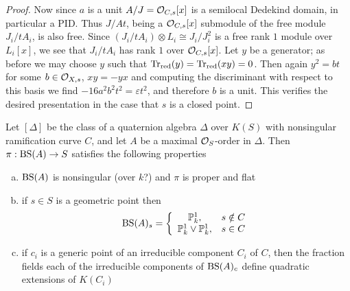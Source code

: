 \begin{proof}
Now since $a$ is a unit $A/J = \mathcal{O}_{C,s}[x]$ is a semilocal Dedekind domain, in particular a PID.  Thus $J/At$, being a $\mathcal{O}_{C,s}[x]$ submodule of the free module $J_i/tA_i$, is also free.  Since $(J_i/tA_i)\otimes L_i\cong J_i/J_i^2$ is a free rank $1$ module over $L_i[x]$, we see that $J_i/tA_i$ has rank $1$ over $\mathcal{O}_{C,s}[x]$.  Let $y$ be a generator; as before we may choose $y$ such that $\textnormal{Tr}_{\text{red}}(y) = \textnormal{Tr}_{\text{red}}(xy) =0$.  Then again $y^2 = bt$ for some $b\in\mathcal{O}_{X,s}$, $xy = -yx$ and computing the discriminant with respect to this basis we find $-16a^2b^2t^2 = \varepsilon t^2$, and therefore $b$ is a unit.  This verifies the desired presentation in the case that $s$ is a closed point.
\end{proof} 

\begin{prop}
Let $[\Delta]$ be the class of a quaternion algebra $\Delta$ over $K(S)$ with nonsingular ramification curve $C$, and let $A$ be a maximal $\mathcal{O}_S$-order in $\Delta$.  Then $\pi: \textnormal{BS}(A)\rightarrow S$ satisfies the following properties
\begin{enumerate}[(a)]
\item  $\textnormal{BS}(A)$ is nonsingular (over $k$?) and $\pi$ is proper and flat
\item  if $s\in S$ is a geometric point then
$$\textnormal{BS}(A)_s = \left\lbrace \begin{array}{cl}
\mathbb{P}^1_{k},              & s\notin C\\
\mathbb{P}^1_{k}\vee\mathbb{P}^1_{k},& s\in    C
\end{array}\right.$$
\item  if $c_i$ is a generic point of an irreducible component $C_i$ of $C$, then the fraction fields each of the irreducible components of $\textnormal{BS}(A)_c$ define quadratic extensions of $K(C_i)$
\end{enumerate}
\end{prop}
